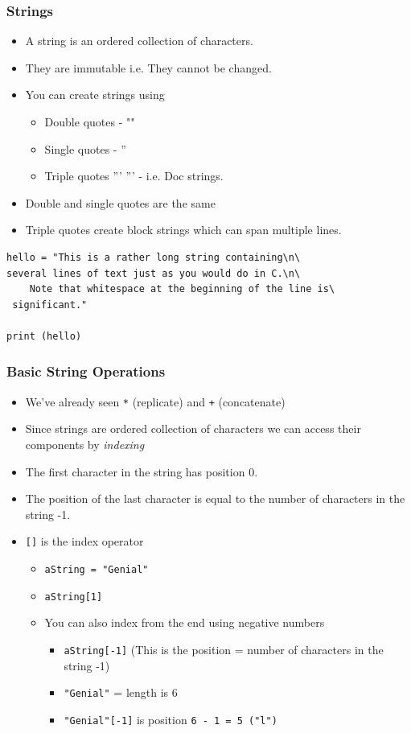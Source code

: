 \documentclass{beamer}
\begin{document}
\begin{frame}[containsverbatim]
\frametitle{Strings}
\begin{itemize}
\item A string is an ordered collection of characters.
\item They are immutable i.e. They cannot be changed.
\item You can create strings using 
\begin{itemize}
\item Double quotes - ""
\item Single quotes - ''
\item Triple quotes ''' ''' - i.e. Doc strings.
\end{itemize}
\item Double and single quotes are the same
\item Triple quotes create block strings which can span multiple lines.
\end{itemize}
\begin{lstlisting}
hello = "This is a rather long string containing\n\
several lines of text just as you would do in C.\n\
    Note that whitespace at the beginning of the line is\
 significant."

print (hello)
\end{lstlisting}
\end{frame}
 
\begin{frame}
\frametitle{Basic String Operations}
\begin{itemize}
\item We've already seen \texttt{*} (replicate) and \texttt{+} (concatenate)
\item Since strings are ordered collection of characters we can access their components by {\em indexing}
\item The first character in the string has position 0.
\item The position of the last character is equal to the number of characters in the string -1.
\item \texttt{[]} is the index operator
\begin{itemize}
\item \texttt{aString = "Genial"}
\item \texttt{aString[1]}
\item  You can also index from the end using negative numbers
\begin{itemize}
\item \texttt{aString[-1]} (This is the position = number of characters in the string -1)
\item \texttt{"Genial"} = length is 6
\item \texttt{"Genial"[-1]} is position \texttt{6 - 1 = 5 ("l")}
\end{itemize}
\end{itemize}
\end{itemize}
\end{frame}
\end{document}
